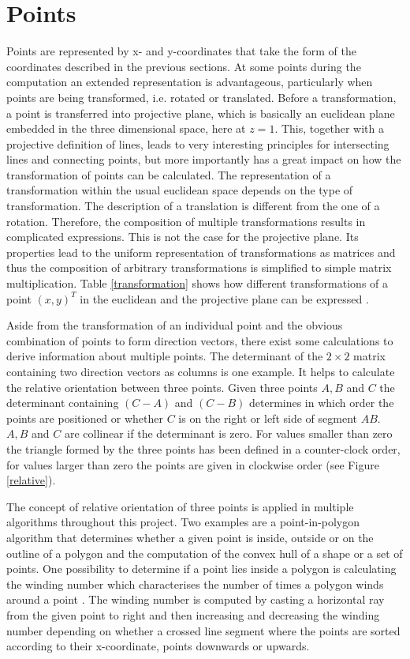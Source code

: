 \section{Points}

Points are represented by x- and y-coordinates that take the form of the coordinates described in the previous sections. At some points during the computation an extended representation is advantageous, particularly when points are being transformed, i.e. rotated or translated. Before a transformation, a point is transferred into projective plane, which is basically an euclidean plane embedded in the three dimensional space, here at $z = 1$. This, together with a projective definition of lines, leads to very interesting principles for intersecting lines and connecting points, but more importantly has a great impact on how the transformation of points can be calculated. The representation of a transformation within the usual euclidean space depends on the type of transformation. The description of a translation is different from the one of a rotation. Therefore, the composition of multiple transformations results in complicated expressions. This is not the case for the projective plane. Its properties lead to the uniform representation of transformations as matrices and thus the composition of arbitrary transformations is simplified to simple matrix multiplication. Table \ref{transformation} shows how different transformations of a point $(x, y)^{T}$ in the euclidean and the projective plane can be expressed \cite{richter11}.


Aside from the transformation of an individual point and the obvious combination of points to form direction vectors, there exist some calculations to derive information about multiple points. The determinant of the $2 \times 2$ matrix containing two direction vectors as columns is one example. It helps to calculate the relative orientation between three points. Given three points $A,B$ and $C$ the determinant containing $(C-A)$ and $(C-B)$ determines in which order the points are positioned or whether $C$ is on the right or left side of segment $AB$. $A,B$ and $C$ are collinear if the determinant is zero. For values smaller than zero the triangle formed by the three points has been defined in a counter-clock order, for values larger than zero the points are given in clockwise order (see Figure \ref{relative}).


The concept of relative orientation of three points is applied in multiple algorithms throughout this project. Two examples are a point-in-polygon algorithm that determines whether a given point is inside, outside or on the outline of a polygon and the computation of the convex hull of a shape or a set of points. One possibility to determine if a point lies inside a polygon is calculating the winding number which characterises the number of times a polygon winds around a point \cite{hormann01}. The winding number is computed by casting a horizontal ray from the given point to right and then increasing and decreasing the winding number depending on whether a crossed line segment where the points are sorted according to their x-coordinate, points downwards or upwards.

